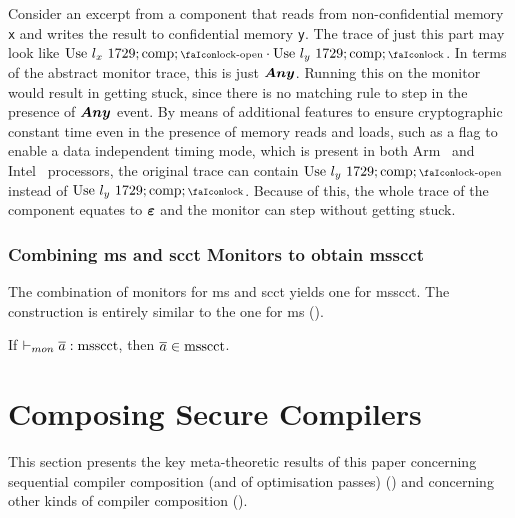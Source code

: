 \documentclass[utf8,acmsmall,review,screen,dvipsnames,anonymous]{acmart}
\begin{document}
\begin{example}
  Consider an excerpt from a component that reads from non-confidential memory \texttt{x} and writes the result to confidential memory \texttt{y}.
  The trace of just this part may look like $\ev{Use}\ \loc_{x}\ 1729;\comp;\unlock\cdot\ev{Use}\ \loc_{y}\ 1729;\comp;\lock$.
  In terms of the abstract monitor trace, this is just $\bm{Any}$.
  Running this on the monitor would result in getting stuck, since there is no matching rule to step in the presence of $\bm{Any}$ event. %
  By means of additional features to ensure cryptographic constant time even in the presence of memory reads and loads, such as a flag to enable a data independent timing mode, which is present in both Arm~\cite[p.~543]{arm-refman} and Intel~\cite[p.~80]{intel-refman} processors, the original trace can contain $\ev{Use}\ \loc_{y}\ 1729;\comp;\unlock$ instead of $\ev{Use}\ \loc_{y}\ 1729;\comp;\lock$.
  Because of this, the whole trace of the component equates to $\bm{\varepsilon}$ and the monitor can step without getting stuck.
\end{example}

\subsubsection{Combining \gls*{ms} and \gls*{scct} Monitors to obtain \gls*{msscct}}

The combination of monitors for \gls*{ms} and \gls*{scct} yields one for \gls*{msscct}.
The construction is entirely similar to the one for \gls*{ms} ().

\begin{lemma}\label{lem:mon:msscctsafe}
  If $\vdash_{mon}{\overline{a}}:{\operatorname{msscct}}$, then $\overline{a}\in\operatorname{msscct}$. %
\end{lemma}

\section{Composing Secure Compilers}\label{sec:compcomp}

This section presents the key meta-theoretic results of this paper concerning sequential compiler composition (and of optimisation passes) () and concerning other kinds of compiler composition ().
\end{document}

